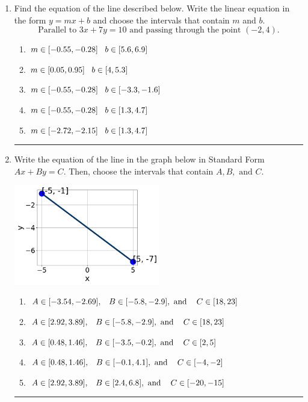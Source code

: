 \documentclass[14pt]{extbook}
\newcommand{\litem}[1]{\item#1\hspace*{-1cm}\rule{\textwidth}{0.4pt}}
\begin{document}
\begin{enumerate}
{\begin{enumerate}[label=\Alph*.]
\end{enumerate} }
\litem{
Find the equation of the line described below. Write the linear equation in the form $ y=mx+b $ and choose the intervals that contain $m$ and $b$.\[ \text{Parallel to } 3 x + 7 y = 10 \text{ and passing through the point } (-2, 4). \]\begin{enumerate}[label=\Alph*.]
\item \( m \in [-0.55, -0.28] \hspace*{3mm} b \in [5.6, 6.9] \)
\item \( m \in [0.05, 0.95] \hspace*{3mm} b \in [4, 5.3] \)
\item \( m \in [-0.55, -0.28] \hspace*{3mm} b \in [-3.3, -1.6] \)
\item \( m \in [-0.55, -0.28] \hspace*{3mm} b \in [1.3, 4.7] \)
\item \( m \in [-2.72, -2.15] \hspace*{3mm} b \in [1.3, 4.7] \)

\end{enumerate} }
\litem{
Write the equation of the line in the graph below in Standard Form $Ax+By=C$. Then, choose the intervals that contain $A, B, \text{ and } C$.
\begin{center}
    \includegraphics[width=0.5\textwidth]{../Figures/linearGraphToStandardC.png}
\end{center}
\begin{enumerate}[label=\Alph*.]
\item \( A \in [-3.54, -2.69], \hspace{3mm} B \in [-5.8, -2.9], \text{ and } \hspace{3mm} C \in [18, 23] \)
\item \( A \in [2.92, 3.89], \hspace{3mm} B \in [-5.8, -2.9], \text{ and } \hspace{3mm} C \in [18, 23] \)
\item \( A \in [0.48, 1.46], \hspace{3mm} B \in [-3.5, -0.2], \text{ and } \hspace{3mm} C \in [2, 5] \)
\item \( A \in [0.48, 1.46], \hspace{3mm} B \in [-0.1, 4.1], \text{ and } \hspace{3mm} C \in [-4, -2] \)
\item \( A \in [2.92, 3.89], \hspace{3mm} B \in [2.4, 6.8], \text{ and } \hspace{3mm} C \in [-20, -15] \)


\end{enumerate}}
\end{enumerate}
\end{document}
